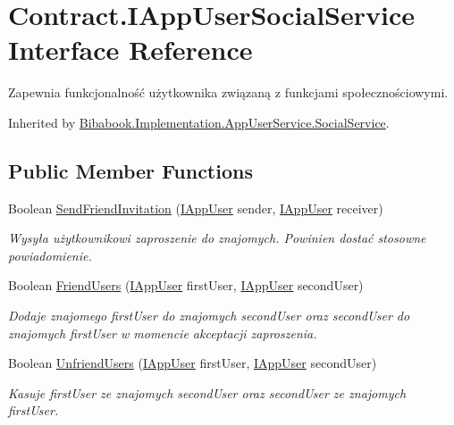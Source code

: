 \hypertarget{interface_contract_1_1_i_app_user_social_service}{}\section{Contract.\+I\+App\+User\+Social\+Service Interface Reference}
\label{interface_contract_1_1_i_app_user_social_service}


Zapewnia funkcjonalność użytkownika związaną z funkcjami społecznościowymi.  




Inherited by \hyperlink{class_bibabook_1_1_implementation_1_1_app_user_service_1_1_social_service}{Bibabook.\+Implementation.\+App\+User\+Service.\+Social\+Service}.

\subsection*{Public Member Functions}
\begin{DoxyCompactItemize}
\item 
Boolean \hyperlink{interface_contract_1_1_i_app_user_social_service_a98b044836f571636c830ce7b57d0dcd9}{Send\+Friend\+Invitation} (\hyperlink{interface_contract_1_1_i_app_user}{I\+App\+User} sender, \hyperlink{interface_contract_1_1_i_app_user}{I\+App\+User} receiver)
\begin{DoxyCompactList}\small\item\em Wysyła użytkownikowi zaproszenie do znajomych. Powinien dostać stosowne powiadomienie. \end{DoxyCompactList}\item 
Boolean \hyperlink{interface_contract_1_1_i_app_user_social_service_a8268c85d8f36d111821c2823e75c92b7}{Friend\+Users} (\hyperlink{interface_contract_1_1_i_app_user}{I\+App\+User} first\+User, \hyperlink{interface_contract_1_1_i_app_user}{I\+App\+User} second\+User)
\begin{DoxyCompactList}\small\item\em Dodaje znajomego first\+User do znajomych second\+User oraz second\+User do znajomych first\+User w momencie akceptacji zaproszenia. \end{DoxyCompactList}\item 
Boolean \hyperlink{interface_contract_1_1_i_app_user_social_service_acdeba4036396536b5c11831f74fc10ec}{Unfriend\+Users} (\hyperlink{interface_contract_1_1_i_app_user}{I\+App\+User} first\+User, \hyperlink{interface_contract_1_1_i_app_user}{I\+App\+User} second\+User)
\begin{DoxyCompactList}\small\item\em Kasuje first\+User ze znajomych second\+User oraz second\+User ze znajomych first\+User. \end{DoxyCompactList}\end{DoxyCompactItemize}


